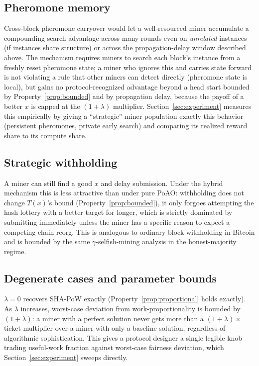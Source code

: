\documentclass[journal]{IEEEtran}
\begin{document}
\subsection{Pheromone memory}
Cross-block pheromone carryover would let a well-resourced miner accumulate a
compounding search advantage across many rounds even on \emph{unrelated}
instances (if instances share structure) or across the propagation-delay
window described above. The mechanism requires miners to search each block's
instance from a freshly reset pheromone state; a miner who ignores this and
carries state forward is not violating a rule that other miners can detect
directly (pheromone state is local), but gains no protocol-recognized
advantage beyond a head start bounded by Property~\ref{prop:bounded} and by
propagation delay, because the payoff of a better $x$ is capped at the
$(1+\lambda)$ multiplier. Section~\ref{sec:experiment} measures this
empirically by giving a ``strategic'' miner population exactly this behavior
(persistent pheromones, private early search) and comparing its realized
reward share to its compute share.

\subsection{Strategic withholding}
A miner can still find a good $x$ and delay submission. Under the hybrid
mechanism this is less attractive than under pure PoAO: withholding does not
change $T(x)$'s bound (Property~\ref{prop:bounded}), it only forgoes
attempting the hash lottery with a better target for longer, which is
strictly dominated by submitting immediately unless the miner has a
specific reason to expect a competing chain reorg. This is analogous to
ordinary block withholding in Bitcoin and is bounded by the same
$\gamma$-selfish-mining analysis in the honest-majority regime.

\subsection{Degenerate cases and parameter bounds}
$\lambda = 0$ recovers SHA-PoW exactly (Property~\ref{prop:proportional} holds
exactly). As $\lambda$ increases, worst-case deviation from work-proportionality
is bounded by $(1+\lambda)$: a miner with a perfect solution never gets more
than a $(1+\lambda)\times$ ticket multiplier over a miner with only a
baseline solution, regardless of algorithmic sophistication. This gives a
protocol designer a single legible knob trading useful-work fraction against
worst-case fairness deviation, which Section~\ref{sec:experiment} sweeps
directly.
\end{document}
